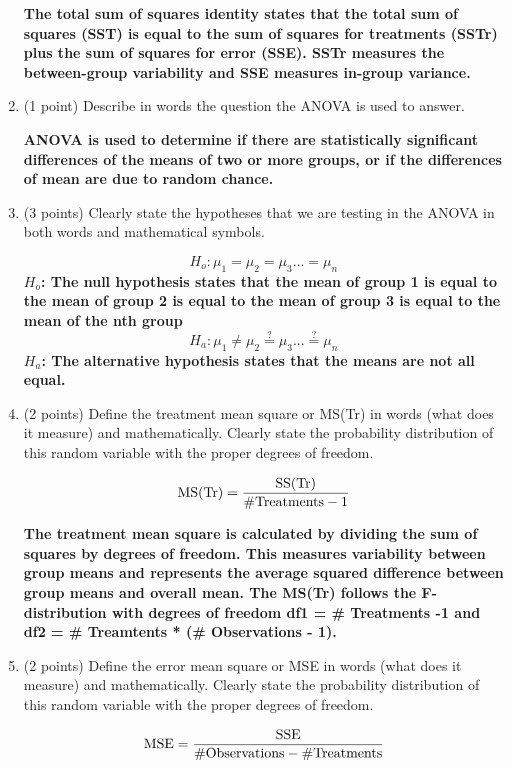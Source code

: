 \documentclass{article}
\begin{document}
\begin{enumerate}
	\textbf{The total sum of squares identity states that the total sum of squares (SST) is equal to the sum of squares for treatments (SSTr) plus the sum of squares for error (SSE). SSTr measures the between-group variability and SSE measures in-group variance.} \\
	
	\item (1 point) Describe in words the question the ANOVA is used to answer.	
	
	\textbf{ANOVA is used to determine if there are statistically significant differences of the means of two or more groups, or if the differences of mean are due to random chance. } \\
	
	
	\item (3 points) Clearly state the hypotheses that we are testing in the ANOVA in both words and mathematical symbols.

\[
H_o: \mu_1 = \mu_2 = \mu_3 ... = \mu_n
\]
\textbf{$H_o$: The null hypothesis states that the mean of group 1 is equal to the mean of group 2 is equal to the mean of group 3 is equal to the mean of the nth group}
\[
H_a: \mu_1 \neq \mu_2 \stackrel{?}{=} \mu_3 ... \stackrel{?}{=} \mu_n
\]
\textbf{$H_a$: The alternative hypothesis states that the means are not all equal.} \\

	\item (2 points) Define the treatment mean square or MS(Tr) in words (what does it measure) and mathematically. Clearly state the probability distribution of this random variable with the proper degrees of freedom.
	
\[
{\rm MS(Tr)} = \frac{{\rm SS(Tr)}}{{\rm \# Treatments - 1}}
\]

	\textbf{The treatment mean square is calculated by dividing the sum of squares by degrees of freedom. This measures variability between group means and represents the average squared difference between group means and overall mean. The MS(Tr) follows the F-distribution with degrees of freedom df1 = \# Treatments -1 and df2 = \# Treamtents * (\# Observations - 1).} \\
	
	\item (2 points) Define the error mean square or MSE in words (what does it measure) and mathematically. Clearly state the probability distribution of this random variable with the proper degrees of freedom.
	
\[
{\rm MSE} = \frac{{\rm SSE}}{{\rm \# Observations - \# Treatments}}
\]
	

\end{enumerate}
\end{document}

